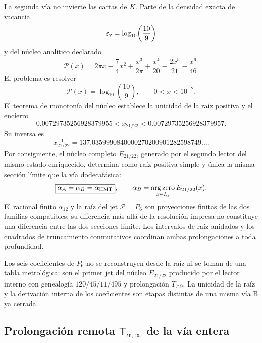 La segunda vía no invierte las cartas de \(K\). Parte de la densidad exacta
de vacancia
\[
 \varepsilon_{\rm v}=\log_{10}\!\left(\frac{10}{9}\right)
\]
y del núcleo analítico declarado
\begin{equation}
 \mathcal P(x)
 =2\pi x-\frac74x^2+\frac{x^3}{2\pi}
  +\frac{x^4}{20}-\frac{2x^5}{21}-\frac{x^6}{46}.
 \label{eq:alpha-rev8-kernel-e21-22}
\end{equation}
El problema es resolver
\begin{equation}
 \mathcal P(x)=\log_{10}\!\left(\frac{10}{9}\right),
 \qquad 0<x<10^{-2}.
 \label{eq:alpha-rev8-ecuacion-e21-22}
\end{equation}
El teorema de monotonía del núcleo establece la unicidad de la raíz positiva
y el encierro
\[
 0.00729735256928379955
 <x_{21/22}<
 0.00729735256928379957.
\]
Su inversa es
\begin{equation}
 x_{21/22}^{-1}
 =137.0359990840000270200901282598749\ldots.
 \label{eq:alpha-rev8-inversa-e21-22}
\end{equation}
Por consiguiente, el núcleo completo \(E_{21/22}\), generado por el segundo
lector del mismo estado enriquecido, determina como raíz positiva simple y
única la misma sección límite que la vía dodecafásica:
\[
 \boxed{\alpha_A=\alpha_B=\alpha_{\rm HMT}},
 \qquad
 \alpha_B=\operatorname*{arg\,zero}_{x\in I_\alpha}E_{21/22}(x).
\]
El racional finito \(\alpha_{12}\) y la raíz del jet \(\mathcal P=P_6\)
son proyecciones finitas de las dos familias compatibles; su diferencia más
allá de la resolución impresa no constituye una diferencia entre las dos
secciones límite. Los intervalos de raíz anidados y los cuadrados de
truncamiento conmutativos coordinan ambas prolongaciones a toda profundidad.

Los seis coeficientes de \(P_6\) no se reconstruyen desde la raíz ni se toman
de una tabla metrológica: son el primer jet del núcleo \(E_{21/22}\) producido
por el lector interno con genealogía \(120/45/11/495\) y prolongación
\(T_{7:9}\). La unicidad de la raíz y la derivación interna de los
coeficientes son etapas distintas de una misma vía B ya cerrada.

\subsection{Prolongación remota \texorpdfstring{\(\mathsf T_{\alpha,\infty}\)}{T alpha infinito} de la vía entera}

